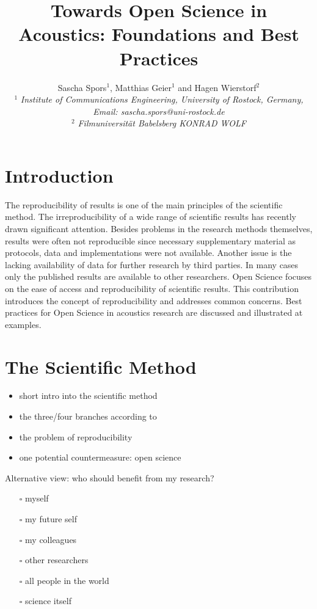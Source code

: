 \documentclass[a4paper, 10pt, twocolumn]{article}
\date{}                                         %
\title{\vspace{-8mm}\textbf{\large
Towards Open Science in Acoustics: Foundations and Best Practices}}
\author{
Sascha Spors$^1$, Matthias Geier$^1$ and Hagen Wierstorf$^2$\\
$^1$ \emph{\small Institute of Communications Engineering, University of Rostock, Germany, Email: sascha.spors@uni-rostock.de}\\
$^2$ \emph{\small Filmuniversität Babelsberg KONRAD WOLF}}
\begin{document}
\maketitle
\thispagestyle{empty}           %

\section*{Introduction} \label{sec:intro} 

The reproducibility of results is one of the main principles of the scientific method. 
The irreproducibility of a wide range of scientific results has recently drawn significant 
attention. Besides problems in the research methods themselves, results were often not 
reproducible since necessary supplementary material as protocols, data and implementations 
were not available. Another issue is the lacking availability of data for further 
research by third parties. In many cases only the published results are available to 
other researchers. Open Science focuses on the ease of access and reproducibility of 
scientific results. This contribution introduces the concept of reproducibility and 
addresses common concerns. Best practices for Open Science in acoustics research are 
discussed and illustrated at examples.


\section*{The Scientific Method} \label{sec:method}

\begin{itemize}
\item short intro into the scientific method
\item the three/four branches according to\cite{Donoho:CSE, Stodden2014:talk}
\item the problem of reproducibility
\item one potential countermeasure: open science
\end{itemize}

Alternative view: who should benefit from my research?

\begin{itemize}
\item[$\square$] myself
\item[$\square$] my future self
\item[$\square$] my colleagues
\item[$\square$] other researchers
\item[$\square$] all people in the world
\item[$\square$] science itself
\end{itemize}
\end{document}
